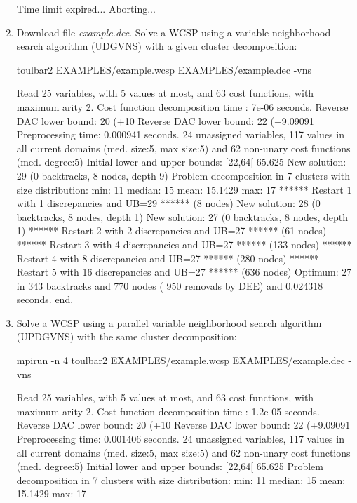 \begin{enumerate}
{\begin{DoxyCode}
Time limit expired... Aborting...
\end{DoxyCode}}
\item Download file {\em example.dec}. Solve a WCSP using a variable neighborhood search algorithm (UDGVNS) with a given cluster decomposition:
\begin{DoxyCode}
	toulbar2 EXAMPLES/example.wcsp EXAMPLES/example.dec -vns
\end{DoxyCode}
{\scriptsize
\begin{DoxyCode}
Read 25 variables, with 5 values at most, and 63 cost functions, with maximum arity 2.
Cost function decomposition time : 7e-06 seconds.
Reverse DAC lower bound: 20 (+10%
Reverse DAC lower bound: 22 (+9.09091%
Preprocessing time: 0.000941 seconds.
24 unassigned variables, 117 values in all current domains (med. size:5, max size:5) and 62 non-unary cost functions (med. degree:5)
Initial lower and upper bounds: [22,64[ 65.625%
New solution: 29 (0 backtracks, 8 nodes, depth 9)
Problem decomposition in 7 clusters with size distribution: min: 11 median: 15 mean: 15.1429 max: 17
****** Restart 1 with 1 discrepancies and UB=29 ****** (8 nodes)
New solution: 28 (0 backtracks, 8 nodes, depth 1)
New solution: 27 (0 backtracks, 8 nodes, depth 1)
****** Restart 2 with 2 discrepancies and UB=27 ****** (61 nodes)
****** Restart 3 with 4 discrepancies and UB=27 ****** (133 nodes)
****** Restart 4 with 8 discrepancies and UB=27 ****** (280 nodes)
****** Restart 5 with 16 discrepancies and UB=27 ****** (636 nodes)
Optimum: 27 in 343 backtracks and 770 nodes ( 950 removals by DEE) and 0.024318 seconds.
end.
\end{DoxyCode}}
\item Solve a WCSP using a parallel variable neighborhood search algorithm (UPDGVNS) with the same cluster decomposition:
\begin{DoxyCode}
	mpirun -n 4 toulbar2 EXAMPLES/example.wcsp EXAMPLES/example.dec -vns
\end{DoxyCode}
{\scriptsize
\begin{DoxyCode}
Read 25 variables, with 5 values at most, and 63 cost functions, with maximum arity 2.
Cost function decomposition time : 1.2e-05 seconds.
Reverse DAC lower bound: 20 (+10%
Reverse DAC lower bound: 22 (+9.09091%
Preprocessing time: 0.001406 seconds.
24 unassigned variables, 117 values in all current domains (med. size:5, max size:5) and 62 non-unary cost functions (med. degree:5)
Initial lower and upper bounds: [22,64[ 65.625%
Problem decomposition in 7 clusters with size distribution: min: 11 median: 15 mean: 15.1429 max: 17

\end{DoxyCode}}
\end{enumerate}
